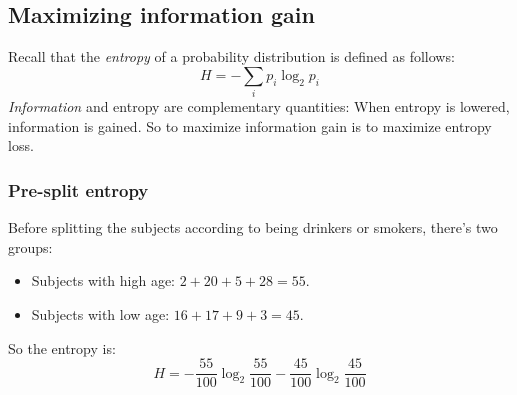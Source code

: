 \documentclass[12pt, a4paper]{article}
\numberwithin{equation}{section}
\begin{document}
\subsection{Maximizing information gain}
Recall that the \textit{entropy} of a probability distribution is defined as follows:
\begin{equation}
H=-\sum_i p_i\log_2 p_i
\end{equation}
\textit{Information} and entropy are complementary quantities: When entropy is lowered, information is gained. So to maximize information gain is to maximize entropy loss.

\subsubsection{Pre-split entropy}
Before splitting the subjects according to being drinkers or smokers, there's two groups:
\begin{itemize}
\item Subjects with high age: $2+20+5+28=55$.
\item Subjects with low age: $16+17+9+3=45$.
\end{itemize}
So the entropy is:
\begin{equation}
H=-\frac{55}{100}\log_2\frac{55}{100}-\frac{45}{100}\log_2\frac{45}{100}
\end{equation}
\end{document}
